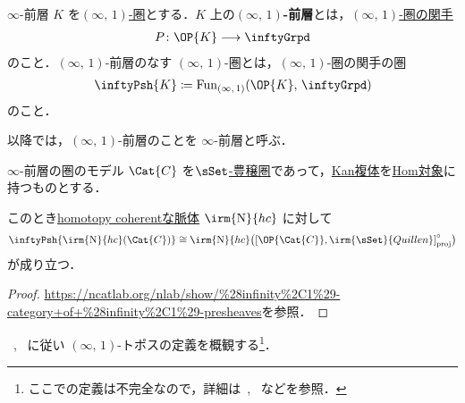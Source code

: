 \documentclass[TQFT_main]{subfiles}
\begin{document}
\begin{mydef}[label=def:infinity-presheaf]{$\infty$-前層}
    $K$ を\hyperref[def:infinity-1]{$(\infty,\, 1)$-圏}とする．$K$ 上の\textbf{$(\infty,\, 1)$-前層}とは，\hyperref[def:infinity-1]{$(\infty,\, 1)$-圏の関手}
    \begin{align}
        P \colon \OP{K} \lto \inftyGrpd
    \end{align}
    のこと．$(\infty,\, 1)$-前層のなす $(\infty,\, 1)$-圏とは，$(\infty,\, 1)$-圏の関手の圏
    \begin{align}
        \inftyPsh{K} \coloneqq \mathrm{Fun}_{(\infty,\, 1)} (\OP{K},\, \inftyGrpd)
    \end{align}
    のこと．
\end{mydef}

\begin{marker}
    以降では，$(\infty,\, 1)$-前層のことを $\infty$-前層と呼ぶ．
\end{marker}


\begin{myprop}[label=prop:nerve-grpd-Psh]{$\infty$-前層の圏のモデル}
    $\Cat{C}$ を\hyperref[def:enriched]{$\sSet$-豊穣圏}であって，\hyperref[def:KanCplx]{Kan複体}を\hyperref[def:enriched]{Hom対象}に持つものとする．
    
    このとき\hyperref[def:nerve-hc]{homotopy coherentな脈体} $\irm{\mathrm{N}}{hc}$ に対して
    \begin{align}
        \inftyPsh{\irm{\mathrm{N}}{hc}(\Cat{C})} \cong \irm{\mathrm{N}}{hc} \bigl( \comm{\OP{\Cat{C}}}{\irm{\sSet}{Quillen}}_{\mathrm{proj}}^\circ \bigr)
    \end{align}
    が成り立つ．
\end{myprop}

\begin{proof}
    \url{https://ncatlab.org/nlab/show/%28infinity%2C1%29-category+of+%28infinity%2C1%29-presheaves}を参照．
\end{proof}

~\cite{nLab}, ~\cite[p.9]{NSS2012}に従い $(\infty,\, 1)$-トポスの定義を概観する\footnote{ここでの定義は不完全なので，詳細は~\cite{nLab}, ~\cite{lurie2008higher}などを参照．}．
\end{document}
